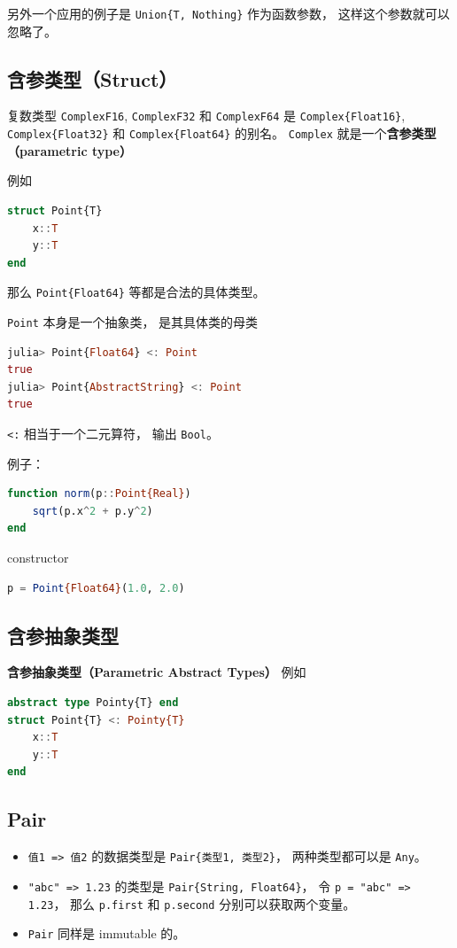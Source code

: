 另外一个应用的例子是 \verb`Union{T, Nothing}` 作为函数参数， 这样这个参数就可以忽略了。

\subsection{含参类型（Struct）}

复数类型 \verb`ComplexF16`, \verb`ComplexF32` 和 \verb`ComplexF64` 是 \verb`Complex{Float16}`, \verb`Complex{Float32}` 和 \verb`Complex{Float64}` 的别名。 \verb`Complex` 就是一个\textbf{含参类型（parametric type）}

例如
\begin{lstlisting}[language=julia]
struct Point{T}
    x::T
    y::T
end
\end{lstlisting}
那么 \verb`Point{Float64}` 等都是合法的具体类型。

\verb`Point` 本身是一个抽象类， 是其具体类的母类
\begin{lstlisting}[language=julia]
julia> Point{Float64} <: Point
true
julia> Point{AbstractString} <: Point
true
\end{lstlisting}
\verb`<:` 相当于一个二元算符， 输出 \verb`Bool`。

例子：
\begin{lstlisting}[language=julia]
function norm(p::Point{Real})
    sqrt(p.x^2 + p.y^2)
end
\end{lstlisting}
constructor
\begin{lstlisting}[language=julia]
p = Point{Float64}(1.0, 2.0)
\end{lstlisting}

\subsection{含参抽象类型}
\textbf{含参抽象类型（Parametric Abstract Types）}
例如
\begin{lstlisting}[language=julia]
abstract type Pointy{T} end
struct Point{T} <: Pointy{T}
    x::T
    y::T
end
\end{lstlisting}


\subsection{Pair}
\begin{itemize}
\item \verb`值1 => 值2` 的数据类型是 \verb`Pair{类型1, 类型2}`， 两种类型都可以是 \verb`Any`。
\item \verb`"abc" => 1.23` 的类型是 \verb`Pair{String, Float64}`， 令 \verb`p = "abc" => 1.23`， 那么 \verb`p.first` 和 \verb`p.second` 分别可以获取两个变量。
\item \verb`Pair` 同样是 immutable 的。
\end{itemize}


